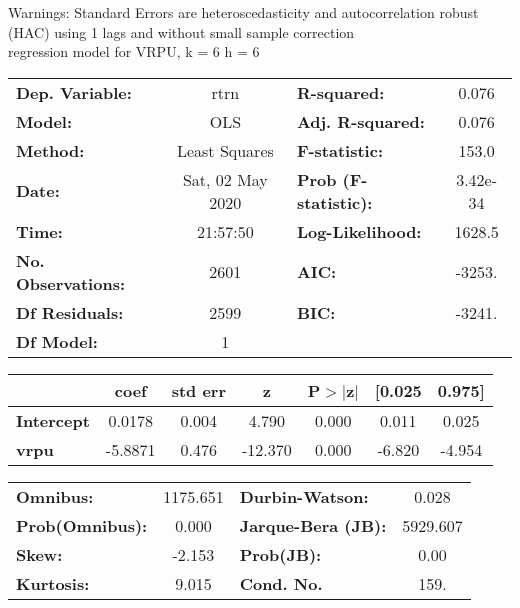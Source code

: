 Warnings: \newline
 [1] Standard Errors are heteroscedasticity and autocorrelation robust (HAC) using 1 lags and without small sample correction\\ 

regression model for VRPU, k = 6 h = 6\begin{center}
\begin{tabular}{lclc}
\toprule
\textbf{Dep. Variable:}    &       rtrn       & \textbf{  R-squared:         } &     0.076   \\
\textbf{Model:}            &       OLS        & \textbf{  Adj. R-squared:    } &     0.076   \\
\textbf{Method:}           &  Least Squares   & \textbf{  F-statistic:       } &     153.0   \\
\textbf{Date:}             & Sat, 02 May 2020 & \textbf{  Prob (F-statistic):} &  3.42e-34   \\
\textbf{Time:}             &     21:57:50     & \textbf{  Log-Likelihood:    } &    1628.5   \\
\textbf{No. Observations:} &        2601      & \textbf{  AIC:               } &    -3253.   \\
\textbf{Df Residuals:}     &        2599      & \textbf{  BIC:               } &    -3241.   \\
\textbf{Df Model:}         &           1      & \textbf{                     } &             \\
\bottomrule
\end{tabular}
\begin{tabular}{lcccccc}
                   & \textbf{coef} & \textbf{std err} & \textbf{z} & \textbf{P$> |$z$|$} & \textbf{[0.025} & \textbf{0.975]}  \\
\midrule
\textbf{Intercept} &       0.0178  &        0.004     &     4.790  &         0.000        &        0.011    &        0.025     \\
\textbf{vrpu}      &      -5.8871  &        0.476     &   -12.370  &         0.000        &       -6.820    &       -4.954     \\
\bottomrule
\end{tabular}
\begin{tabular}{lclc}
\textbf{Omnibus:}       & 1175.651 & \textbf{  Durbin-Watson:     } &    0.028  \\
\textbf{Prob(Omnibus):} &   0.000  & \textbf{  Jarque-Bera (JB):  } & 5929.607  \\
\textbf{Skew:}          &  -2.153  & \textbf{  Prob(JB):          } &     0.00  \\
\textbf{Kurtosis:}      &   9.015  & \textbf{  Cond. No.          } &     159.  \\
\bottomrule
\end{tabular}
\end{center}

